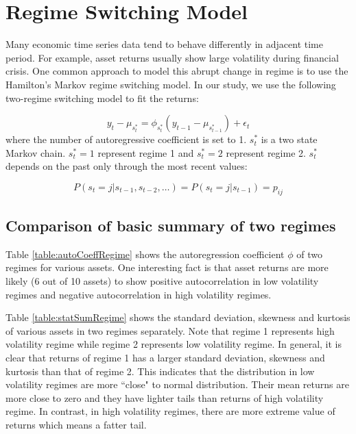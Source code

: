 \documentclass[12pt]{article}
\begin{document}
\section{Regime Switching Model}
\fi

Many economic time series data tend to behave differently in adjacent time period. For example, asset returns
usually show large volatility during financial crisis. One common approach to model this abrupt change in regime is to use the Hamilton's Markov regime switching model. In our study, we use the following two-regime switching model to fit the returns:

\begin{equation}
y_t - \mu_{s^*_t} = \phi_{s^*_t} (y_{t-1} - \mu_{s^*_{t-1}}) + \epsilon_t
\end{equation}
where the number of autoregressive coefficient is set to 1. $s^*_t$ is a two state Markov chain. $s^*_t = 1$ represent regime 1 and $s^*_t = 2$ represent regime 2. $s^*_t$ depends on the past only through the most recent values:

\begin{equation}
P(s_t = j|s_{t-1}, s_{t-2}, \dots) = P(s_t = j|s_{t-1})  = p_{ij}
\end{equation}

\subsection{Comparison of basic summary of two regimes}

Table \ref{table:autoCoeffRegime} shows the autoregression coefficient $\phi$ of two regimes for various assets. One interesting fact is that asset returns are more likely (6 out of 10 assets) to show positive autocorrelation in low volatility regimes and negative autocorrelation in high volatility regimes.

Table \ref{table:statSumRegime} shows the standard deviation, skewness and kurtosis of various assets in two regimes separately. Note that regime 1 represents high volatility regime while regime 2 represents low volatility regime. In general, it is clear that returns of regime 1 has a larger standard deviation, skewness and kurtosis than that of regime 2. This indicates that the distribution in low volatility regimes are more ``close" to normal distribution. Their mean returns are more close to zero and they have lighter tails than returns of high volatility regime. In contrast, in high volatility regimes, there are more extreme value of returns which means a fatter tail.
\end{document}
